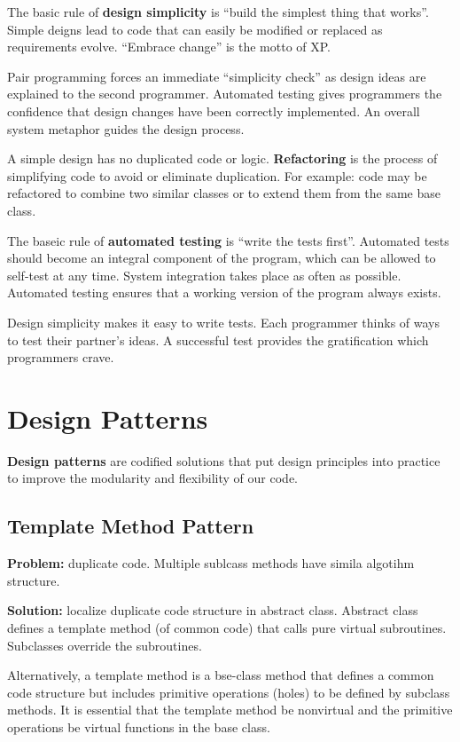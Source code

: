 \documentclass[12pt]{article}
\begin{document}
The basic rule of {\bf design simplicity} is ``build the simplest thing that works''. Simple deigns lead to code that can easily be modified or replaced as requirements evolve. ``Embrace change'' is the motto of XP.\@

Pair programming forces an immediate ``simplicity check'' as design ideas are explained to the second programmer. Automated testing gives programmers the confidence that design changes have been correctly implemented. An overall system metaphor guides the design process.

A simple design has no duplicated code or logic. {\bf Refactoring} is the process of simplifying code to avoid or eliminate duplication. For example: code may be refactored to combine two similar classes or to extend them from the same base class.

The baseic rule of {\bf automated testing} is ``write the tests first''. Automated tests should become an integral component of the program, which can be allowed to self-test at any time. System integration takes place as often as possible. Automated testing ensures that a working version of the program always exists.

Design simplicity makes it easy to write tests. Each programmer thinks of ways to test their partner's ideas. A successful test provides the gratification which programmers crave.

\section{Design Patterns}
{\bf Design patterns} are codified solutions that put design principles into practice to improve the modularity and flexibility of our code.

\subsection{Template Method Pattern}
{\bf Problem:} duplicate code. Multiple sublcass methods have simila algotihm structure.

{\bf Solution:} localize duplicate code structure in abstract class. Abstract class defines a template method (of common code) that calls pure virtual subroutines. Subclasses override the subroutines.

Alternatively, a template method is a bse-class method that defines a common code structure but includes primitive operations (holes) to be defined by subclass methods. It is essential that the template method be nonvirtual and the primitive operations be virtual functions in the base class.
\end{document}
